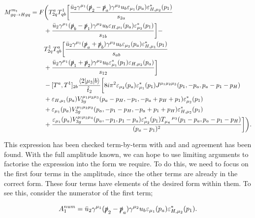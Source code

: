 \begin{equation}
\begin{split}
M_{gq \to Hgq}^{m_t} = F &\biggl( T^a_{2q}T^1_{qb} \biggl[ \frac{ \bar{u}_2 \gamma^{\mu_1} (\slashed{p}_2 - \slashed{p}_a ) \gamma^{\mu_2} u_b \varepsilon_{\mu_1} (p_a) \varepsilon_{H,\mu_2}^*(p_1)}{s_{2a}} \\
&+ \frac{\bar{u}_2 \gamma^{\mu_1} (\slashed{p}_b - \slashed{p}_1)\gamma^{\mu_2}u_b \varepsilon_{H,\mu_1}(p_a)\varepsilon^*_{\mu_2}(p_1)}{s_{1b}} \biggr] - \\
&T^1_{2q}T^a_{qb} \biggl[ \frac{\bar{u}_2 \gamma^{\mu_1}(\slashed{p}_a+\slashed{p}_b)\gamma^{\mu_2} u_b \varepsilon_{\mu_2}(p_a)\varepsilon^*_{H,\mu_1}(p_1)}{s_{ab}} \\
& + \frac{\bar{u}_2 \gamma^{\mu_1}(\slashed{p}_1+\slashed{p}_2)\gamma^{\mu_2}u_b \varepsilon_{\mu_1}^*(p_1) \varepsilon_{H,\mu_2}(p_a)}{s_{12}} \biggr]  \\
 &- [T^a, T^1]_{2b} \frac{\mathinner{\langle2\vert\mu_3\vert b\rangle}_{}}{\hat{t}_2} \biggl[ 8 i \pi^2 \varepsilon_{\mu_2}(p_a) \varepsilon^*_{\mu_1}(p_1)J^{\mu_1 \mu_2 \mu_3}(p_1,-p_a,p_a-p_1-p_H) \\
&+  \varepsilon_{H,\mu_1}(p_a)V_{3g}^{\mu_1 \mu_2 \mu_3}(p_a-p_H, -p_1, -p_a + p_H + p_1) \varepsilon^*_{\mu_2}(p_1)  \\
&+  \varepsilon_{\mu_1}(p_a)V_{3g}^{\mu_1 \mu_2 \mu_3}(p_a,-p_1-p_H,-p_a+p_1+p_H)\varepsilon_{H,\mu_2}^*(p_1)  \\
&+  \frac{\varepsilon_{\mu_1}(p_a)V_{3g}^{\mu_! \mu_2 \mu_4}(p_a,-p_1,p_1-p_a)\varepsilon^*_{\mu_2}(p_1)T_{\mu_4}^{\hspace{10pt} \mu_3}(p_1-p_a,p_a-p_1-p_H)}{(p_a-p_1)^2} \biggr] \biggr).
\end{split}
\end{equation}

This expression has been checked term-by-term with \cite{DelDuca2001} and \cite{Duca2003} and agreement has been found. With the full amplitude known, we can hope to use limiting arguments to factorise the expression into the form we require. To do this, we need to focus on the first four terms in the amplitude, since the other terms are already in the correct form. These four terms have elements of the desired form within them. To see this, consider the numerator of the first term;

\begin{equation}
A_1^{num} = \bar{u}_2 \gamma^{\mu_1}(\slashed{p}_2-\slashed{p}_a)\gamma^{\mu_2}u_b \varepsilon_{\mu_1}(p_a)\varepsilon^*_{H,\mu_2}(p_1).
\end{equation}

